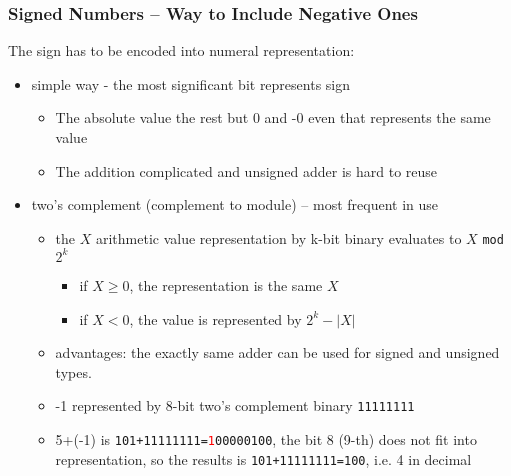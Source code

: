 \documentclass{beamer}
\begin{document}
\begin{frame}
\frametitle{Signed Numbers -- Way to Include Negative Ones}

The sign has to be encoded into numeral representation:
\begin{itemize}
\item simple way - the most significant bit represents sign
\begin{itemize}
\item The absolute value the rest but 0 and -0 even that represents the same value
\item The addition complicated and unsigned adder is hard to reuse
\end{itemize}
\item two's complement (complement to module) -- most frequent in use
\begin{itemize}
\item the $X$ arithmetic value representation by k-bit binary evaluates to $X$ \texttt{mod} $2^k$
\begin{itemize}
\item if $X\ge0$, the representation is the same $X$
\item if $X<0$, the value is represented by $2^k-|X|$
\end{itemize}
\item advantages: the exactly same adder can be used for signed and unsigned types.
\end{itemize}
\begin{itemize}
\item -1 represented by 8-bit two's complement binary \texttt{11111111}
\item 5+(-1) is \texttt{101+11111111=\textcolor{red}{1}00000100}, the bit 8 (9-th) does not fit into representation, so the results is \texttt{101+11111111=100}, i.e. 4 in decimal
\end{itemize}
\end{itemize}


\end{frame}
\end{document}
